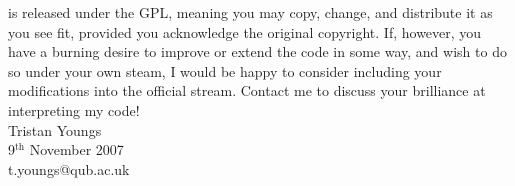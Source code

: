 \documentclass[a4paper,10pt]{report}
\begin{document}
\progname{} is released under the GPL, meaning you may copy, change, and distribute it as you see fit, provided you acknowledge the original copyright. If, however, you have a burning desire to improve or extend the code in some way, and wish to do so under your own steam, I would be happy to consider including your modifications into the official stream. Contact me to discuss your brilliance at interpreting my code!\\

Tristan Youngs\\
9$^\textrm{th}$ November 2007\\
t.youngs@qub.ac.uk\\












\printindex
\end{document}
